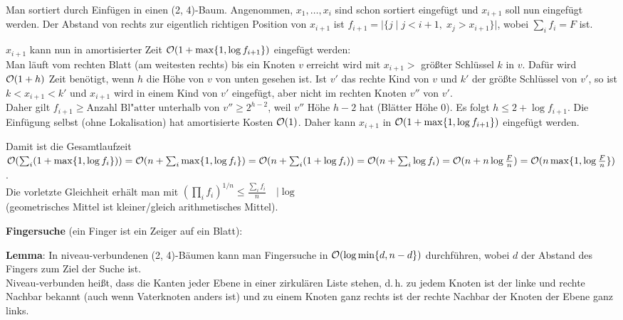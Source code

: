 \begin{Beweis}
    Man sortiert durch Einfügen in einen (2, 4)-Baum.
    Angenommen, $x_1, \dotsc, x_i$ sind schon sortiert eingefügt
    und $x_{i+1}$ soll nun eingefügt werden.
    Der Abstand von rechts zur eigentlich richtigen Position von $x_{i+1}$
    ist $f_{i+1} = |\{j \;|\; j < i + 1,\; x_j > x_{i+1}\}|$, wobei
    $\sum_i f_i = F$ ist.

    $x_{i+1}$ kann nun in amortisierter Zeit
    $\mathcal{O}(1 + \max\{1, \log f_{i+1}\})$ eingefügt werden: \\
    Man läuft vom rechten Blatt (am weitesten rechts) bis ein Knoten
    $v$ erreicht wird mit $x_{i+1} >$ größter Schlüssel $k$ in $v$.
    Dafür wird $\mathcal{O}(1 + h)$ Zeit benötigt, wenn $h$ die Höhe von $v$
    von unten gesehen ist.
    Ist $v'$ das rechte Kind von $v$ und $k'$ der größte Schlüssel von
    $v'$, so ist $k < x_{i+1} < k'$ und $x_{i+1}$ wird in einem Kind
    von $v'$ eingefügt, aber nicht im rechten Knoten $v''$ von $v'$. \\
    Daher gilt $f_{i+1} \ge \text{Anzahl Bl"atter unterhalb von } v''
    \ge 2^{h-2}$, weil $v''$ Höhe $h - 2$ hat (Blätter Höhe $0$).
    Es folgt $h \le 2 + \log f_{i+1}$.
    Die Einfügung selbst (ohne Lokalisation) hat amortisierte Kosten
    $\mathcal{O}(1)$.
    Daher kann $x_{i+1}$ in $\mathcal{O}(1 + \max\{1, \log f_{i+1}\})$ eingefügt
    werden.

    Damit ist die Gesamtlaufzeit
    $\mathcal{O}(\sum_i (1 + \max\{1, \log f_i\}))
    = \mathcal{O}(n + \sum_i \max\{1, \log f_i\}) \\
    = \mathcal{O}(n + \sum_i (1 + \log f_i))
    = \mathcal{O}(n + \sum_i \log f_i)
    = \mathcal{O}(n + n \log \frac{F}{n})
    = \mathcal{O}(n \max\{1, \log \frac{F}{n}\})$. \\
    Die vorletzte Gleichheit erhält man mit
    $(\prod_i f_i)^{1/n} \le \frac{\sum_i f_i}{n} \quad |\log$ \\
    (geometrisches Mittel ist kleiner/gleich arithmetisches Mittel).
\end{Beweis}

\linie

\textbf{Fingersuche}
(ein Finger ist ein Zeiger auf ein Blatt):

\textbf{Lemma}:
In niveau-verbundenen (2, 4)-Bäumen kann man Fingersuche in
$\mathcal{O}(\log \min\{d, n - d\})$ durchführen, wobei $d$ der Abstand des
Fingers zum Ziel der Suche ist. \\
Niveau-verbunden heißt, dass die Kanten jeder Ebene in einer zirkulären
Liste stehen, d.\,h. zu jedem Knoten ist der linke und rechte Nachbar bekannt
(auch wenn Vaterknoten anders ist) und zu einem Knoten ganz
rechts ist der rechte Nachbar der Knoten der Ebene ganz links.

